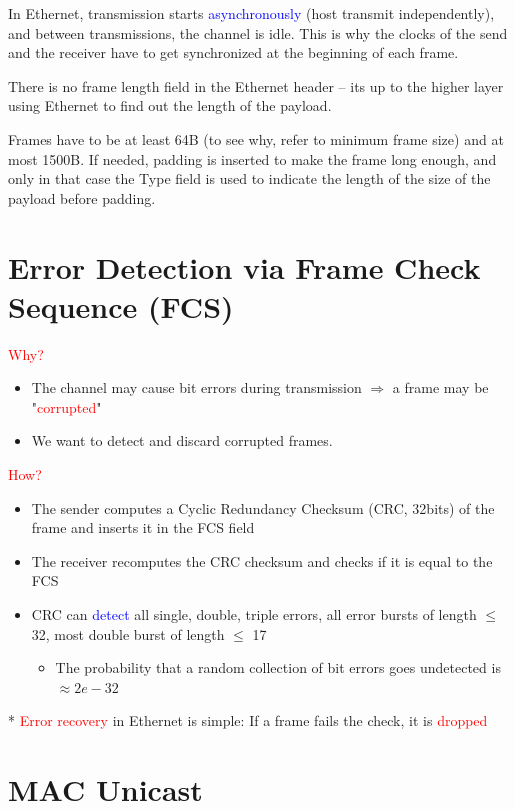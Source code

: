 \documentclass[11pt]{article}
\begin{document}
In Ethernet, transmission starts \textcolor{blue}{asynchronously} (host transmit independently), and between transmissions, the channel is idle. This is why the clocks of the send and the receiver have to get synchronized at the beginning of each frame. 

There is no frame length field in the Ethernet header -- its up to the higher layer using Ethernet to find out the length of the payload. 

Frames have to be at least 64B (to see why, refer to minimum frame size) and at most 1500B. If needed, padding is inserted to make the frame long enough, and only in that case the Type field is used to indicate the length of the size of the payload before padding. 

\section*{Error Detection via Frame Check Sequence (FCS)}
\textcolor{red}{Why?}

\begin{itemize}
	\item The channel may cause bit errors during transmission $\Rightarrow$ a frame may be "\textcolor{red}{corrupted}"
	\item We want to detect and discard corrupted frames.
\end{itemize}
\textcolor{red}{How?}
\begin{itemize}
	\item The sender computes a Cyclic Redundancy Checksum (CRC, 32bits) of the frame and inserts it in the FCS field
	\item The receiver recomputes the CRC checksum and checks if it is equal to the FCS
	\item CRC can \textcolor{blue}{detect} all single, double, triple errors, all error bursts of length $\leq$ 32, most double burst of length  $\leq$ 17
		 \begin{itemize}
			\item The probability that a random collection of bit errors goes undetected is $\approx 2e-32$
		\end{itemize}
\end{itemize}

* \textcolor{red}{Error recovery} in Ethernet is simple: If a frame fails the check, it is \textcolor{red}{dropped}
\section*{MAC Unicast}
\end{document}
